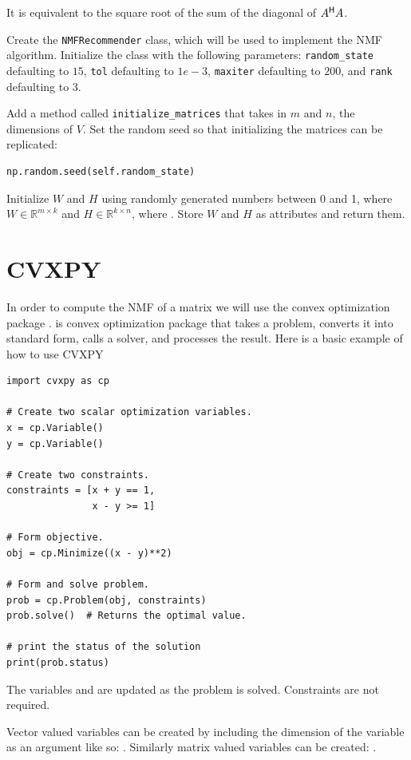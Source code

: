 It is equivalent to the square root of the sum of the diagonal of $A^{\mathsf H} A$.



\begin{problem}
Create the \texttt{NMFRecommender} class, which will be used to implement the NMF algorithm.
Initialize the class with the following parameters:
\texttt{random\_state} defaulting to $15$,
\texttt{tol} defaulting to $1e-3$, \texttt{maxiter} defaulting to $200$, and \texttt{rank} defaulting to $3$.


Add a method called \texttt{initialize\_matrices} that takes in $m$ and $n$, the dimensions of $V$.
Set the random seed so that initializing the matrices can be replicated:
\begin{lstlisting}
np.random.seed(self.random_state)
\end{lstlisting}
Initialize $W$ and $H$ using randomly generated numbers between 0 and 1, where $W\in\mathbb{R}^{m\times k}$ and $H\in\mathbb{R}^{k\times n}$, where .
Store $W$ and $H$ as attributes and return them.
\end{problem}

\section*{CVXPY}
In order to compute the NMF of a matrix we will use the convex optimization package .
 is convex optimization package that takes a problem, converts it into standard form, calls a solver, and processes the result.
Here is a basic example of how to use CVXPY
\begin{lstlisting}
import cvxpy as cp

# Create two scalar optimization variables.
x = cp.Variable()
y = cp.Variable()

# Create two constraints.
constraints = [x + y == 1,
               x - y >= 1]

# Form objective.
obj = cp.Minimize((x - y)**2)

# Form and solve problem.
prob = cp.Problem(obj, constraints)
prob.solve()  # Returns the optimal value.

# print the status of the solution
print(prob.status)
\end{lstlisting}
The variables  and  are updated as the problem is solved.
Constraints are not required.

Vector valued variables can be created by including the dimension of the variable as an argument like so: .
Similarly matrix valued variables can be created: .

